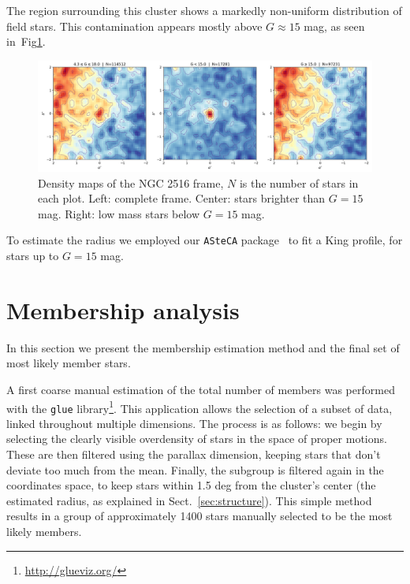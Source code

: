 \documentclass[draft]{aa}
\begin{document}
 The region surrounding this cluster shows a markedly non-uniform distribution
 of field stars. This contamination appears mostly above $G\approx15$ mag, as
 seen in~Fig\ref{fig:density}.

 \begin{figure}
 \centering
 \includegraphics[width=\hsize]{figs/dens_map.png}
 \caption{Density maps of the NGC 2516 frame, $N$ is the number of stars in
 each plot. Left: complete frame. Center: stars brighter than $G=15$ mag. Right:
 low mass stars below $G=15$ mag.}
 \label{fig:density}
 \end{figure}

 To estimate the radius we employed our \texttt{ASteCA}
 package~\citep{Perren_2015} to fit a King profile\citep{King_1962}, for stars
 up to $G=15$ mag.
 \cite{Pieres_2016}



\section{Membership analysis}
 \label{sec:membership}

 In this section we present the membership estimation method and the final set
 of most likely member stars.

 A first coarse manual estimation of the total number of members was performed
 with the \texttt{glue} library\footnote{\url{http://glueviz.org/}}. This
 application allows the selection of a subset of data, linked throughout
 multiple dimensions. The process is as follows: we begin by selecting the
 clearly visible overdensity of stars in the space of proper motions. These are
 then filtered using the parallax dimension, keeping stars that don't deviate
 too much from the mean. Finally, the subgroup is filtered again in the
 coordinates space, to keep stars within 1.5 deg from the cluster's center 
 (the estimated radius, as explained in Sect.~\ref{sec:structure}).
 This simple method results in a group of approximately 1400 stars
 manually selected to be the most likely members.
\end{document}
